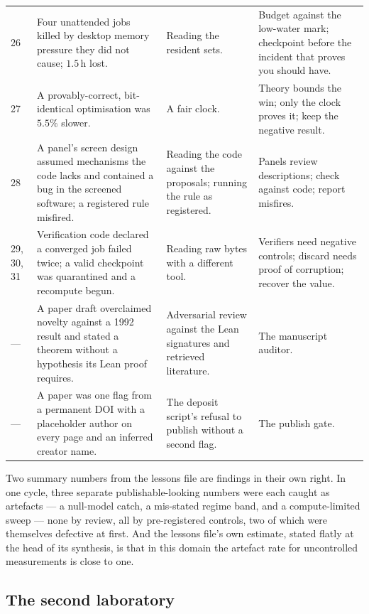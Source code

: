 \documentclass[11pt]{article}
\begin{document}
\begin{center}
\begin{longtable}{@{}p{0.9cm}p{5.4cm}p{3.6cm}p{5.1cm}@{}}
26 & Four unattended jobs killed by desktop memory pressure they did not cause; $1.5$\,h lost. &
Reading the resident sets. & Budget against the low-water mark; checkpoint before the incident
that proves you should have. \\
27 & A provably-correct, bit-identical optimisation was $5.5\%$ slower. & A fair clock. & Theory
bounds the win; only the clock proves it; keep the negative result. \\
28 & A panel's screen design assumed mechanisms the code lacks and contained a bug in the
screened software; a registered rule misfired. & Reading the code against the proposals;
running the rule as registered. & Panels review descriptions; check against code; report
misfires. \\
29, 30, 31 & Verification code declared a converged job failed twice; a valid checkpoint was
quarantined and a recompute begun. & Reading raw bytes with a different tool. & Verifiers need
negative controls; discard needs proof of corruption; recover the value. \\
--- & A paper draft overclaimed novelty against a 1992 result and stated a theorem without a
hypothesis its Lean proof requires. & Adversarial review against the Lean signatures and
retrieved literature. & The manuscript auditor. \\
--- & A paper was one flag from a permanent DOI with a placeholder author on every page and an
inferred creator name. & The deposit script's refusal to publish without a second flag. & The
publish gate. \\
\bottomrule
\end{longtable}
\end{center}

Two summary numbers from the lessons file are findings in their own right. In one cycle, three
separate publishable-looking numbers were each caught as artefacts --- a null-model catch, a
mis-stated regime band, and a compute-limited sweep --- none by review, all by pre-registered
controls, two of which were themselves defective at first. And the lessons file's own estimate,
stated flatly at the head of its synthesis, is that in this domain the artefact rate for
uncontrolled measurements is close to one.

\subsection{The second laboratory}
\end{document}
